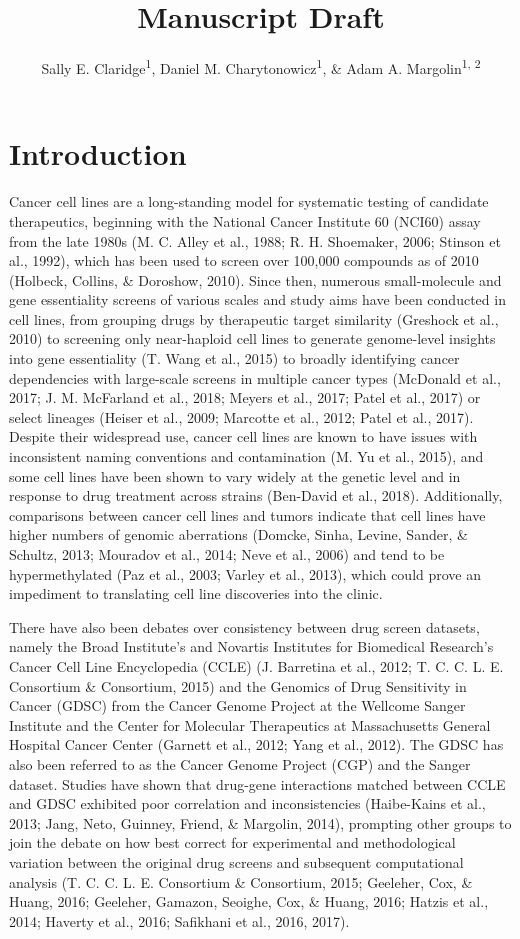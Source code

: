 \documentclass[man,floatsintext]{apa6}
\title{Manuscript Draft}
\author{Sally E. Claridge\textsuperscript{1}, Daniel M.
Charytonowicz\textsuperscript{1}, \& Adam A.
Margolin\textsuperscript{1, 2}}
\date{}
\affiliation{
\vspace{0.5cm}
\textsuperscript{1} Department of Genetics and Genomic Sciences, Icahn Institute for Data Science and Genomic Technology, Icahn School of Medicine at Mount Sinai, New York, NY\\\textsuperscript{2} Cancer Target Discovery and Development Network (Oregon Health and Science University, Portland, OR), National Cancer Institute, National Institutes of Health}
\begin{document}
\maketitle

\section{Introduction}\label{introduction}

Cancer cell lines are a long-standing model for systematic testing of
candidate therapeutics, beginning with the National Cancer Institute 60
(NCI60) assay from the late 1980s (M. C. Alley et al., 1988; R. H.
Shoemaker, 2006; Stinson et al., 1992), which has been used to screen
over 100,000 compounds as of 2010 (Holbeck, Collins, \& Doroshow, 2010).
Since then, numerous small-molecule and gene essentiality screens of
various scales and study aims have been conducted in cell lines, from
grouping drugs by therapeutic target similarity (Greshock et al., 2010)
to screening only near-haploid cell lines to generate genome-level
insights into gene essentiality (T. Wang et al., 2015) to broadly
identifying cancer dependencies with large-scale screens in multiple
cancer types (McDonald et al., 2017; J. M. McFarland et al., 2018;
Meyers et al., 2017; Patel et al., 2017) or select lineages (Heiser et
al., 2009; Marcotte et al., 2012; Patel et al., 2017). Despite their
widespread use, cancer cell lines are known to have issues with
inconsistent naming conventions and contamination (M. Yu et al., 2015),
and some cell lines have been shown to vary widely at the genetic level
and in response to drug treatment across strains (Ben-David et al.,
2018). Additionally, comparisons between cancer cell lines and tumors
indicate that cell lines have higher numbers of genomic aberrations
(Domcke, Sinha, Levine, Sander, \& Schultz, 2013; Mouradov et al., 2014;
Neve et al., 2006) and tend to be hypermethylated (Paz et al., 2003;
Varley et al., 2013), which could prove an impediment to translating
cell line discoveries into the clinic.

There have also been debates over consistency between drug screen
datasets, namely the Broad Institute's and Novartis Institutes for
Biomedical Research's Cancer Cell Line Encyclopedia (CCLE) (J. Barretina
et al., 2012; T. C. C. L. E. Consortium \& Consortium, 2015) and the
Genomics of Drug Sensitivity in Cancer (GDSC) from the Cancer Genome
Project at the Wellcome Sanger Institute and the Center for Molecular
Therapeutics at Massachusetts General Hospital Cancer Center (Garnett et
al., 2012; Yang et al., 2012). The GDSC has also been referred to as the
Cancer Genome Project (CGP) and the Sanger dataset. Studies have shown
that drug-gene interactions matched between CCLE and GDSC exhibited poor
correlation and inconsistencies (Haibe-Kains et al., 2013; Jang, Neto,
Guinney, Friend, \& Margolin, 2014), prompting other groups to join the
debate on how best correct for experimental and methodological variation
between the original drug screens and subsequent computational analysis
(T. C. C. L. E. Consortium \& Consortium, 2015; Geeleher, Cox, \& Huang,
2016; Geeleher, Gamazon, Seoighe, Cox, \& Huang, 2016; Hatzis et al.,
2014; Haverty et al., 2016; Safikhani et al., 2016, 2017).
\end{document}
